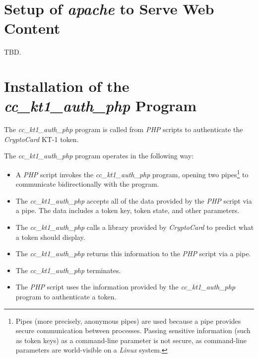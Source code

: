 \section{Setup of \emph{apache} to Serve Web Content}
\label{cist0:ssap0}

TBD.


\section{Installation of the \emph{cc\_kt1\_auth\_php} Program}
\label{cist0:sipg0}

The \emph{cc\_kt1\_auth\_php} program is called from \emph{PHP} scripts to
authenticate the \emph{CryptoCard} KT-1 token.

The \emph{cc\_kt1\_auth\_php} program operates in the following way:

\begin{itemize}
\item A \emph{PHP} script invokes the \emph{cc\_kt1\_auth\_php} program,
      opening two pipes\footnote{Pipes (more precisely, anonymous pipes) are used because a pipe provides
      secure communication between processes.  Passing sensitive information
      (such as token keys) as a command-line parameter is not secure, as
      command-line parameters are world-visible on a \emph{Linux} system.}
      to communicate bidirectionally with the program.
\item The \emph{cc\_kt1\_auth\_php} accepts all of the data provided
      by the \emph{PHP} script via a pipe.  The data includes
      a token key, token state, and other parameters.
\item The \emph{cc\_kt1\_auth\_php} calls a library provided by 
      \emph{CryptoCard} to predict what a token should display.
\item The \emph{cc\_kt1\_auth\_php} returns this information to 
      the \emph{PHP} script via a pipe.
\item The \emph{cc\_kt1\_auth\_php} terminates.
\item The \emph{PHP} script uses the information provided by the
      \emph{cc\_kt1\_auth\_php} program to authenticate a token.
\end{itemize}

